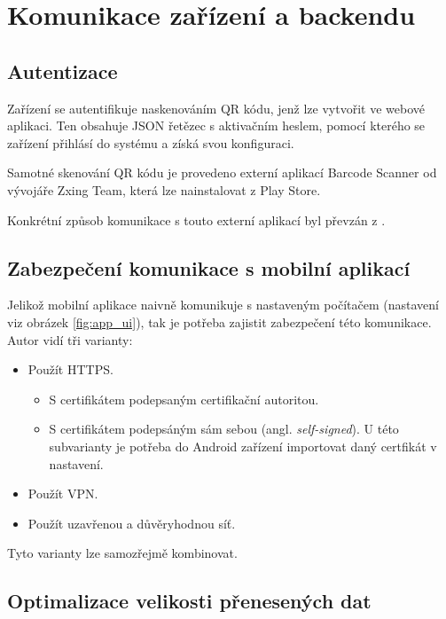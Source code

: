 \section{Komunikace zařízení a backendu}

\subsection{Autentizace}

\noindent
Zařízení se autentifikuje naskenováním QR kódu, jenž lze vytvořit ve webové aplikaci. Ten obsahuje
JSON řetězec s aktivačním heslem, pomocí kterého se zařízení přihlásí do systému a získá svou konfiguraci.

Samotné skenování QR kódu je provedeno externí aplikací Barcode Scanner od vývojáře
Zxing Team, která lze nainstalovat z Play Store.

Konkrétní způsob komunikace s touto externí aplikací byl převzán z \citep[][]{QrScan}. 

\subsection{Zabezpečení komunikace s mobilní aplikací}

\noindent
Jelikož mobilní aplikace naivně komunikuje s nastaveným počítačem (nastavení viz obrázek \ref{fig:app_ui}),
tak je potřeba zajistit zabezpečení této komunikace. Autor vidí tři varianty:

\begin{itemize}
  \setlength\itemsep{0.05em}
  \item Použít HTTPS.
  \begin{itemize}
    \item S certifikátem podepsaným certifikační autoritou.
    \item S certifikátem podepsáným sám sebou (angl. \textit{self-signed}). U této subvarianty je potřeba do Android zařízení importovat daný certfikát v nastavení.
  \end{itemize}
  \item Použít VPN.
  \item Použít uzavřenou a důvěryhodnou síť.
\end{itemize}

\noindent
Tyto varianty lze samozřejmě kombinovat.

\subsection{Optimalizace velikosti přenesených dat} \label{app_resizing}

